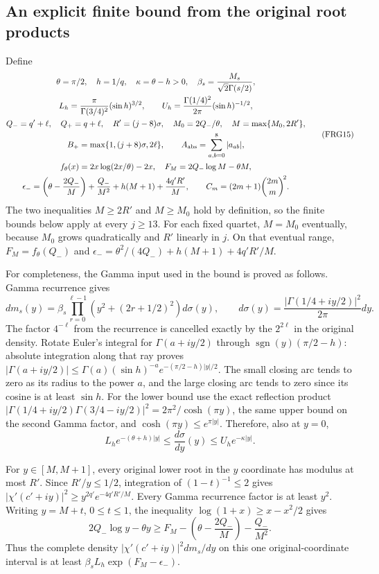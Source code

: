 \documentclass[11pt,a4paper]{article}
\begin{document}
\subsection{An explicit finite bound from the original root products}
Define
\[
\begin{gathered}
\theta=\pi/2,\quad h=1/q,\quad\kappa=\theta-h>0,
\quad\beta_s=\frac{M_s}{\sqrt2\Gamma(s/2)},\\
L_h=\frac{\pi}{\Gamma(3/4)^2}(\sin h)^{3/2},\qquad
U_h=\frac{\Gamma(1/4)^2}{2\pi}(\sin h)^{-1/2},\\
Q_-=q'+\ell,\quad Q_+=q+\ell,\quad
R'=(j-8)\sigma,\quad M_0=2Q_-/\theta,\quad M=\max\{M_0,2R'\},\\
B_+=\max\{1,(j+8)\sigma,2\ell\},\qquad
A_{\rm abs}=\sum_{a,b=0}^8|a_{ab}|,\\
f_\theta(x)=2x\log(2x/\theta)-2x,\quad F_M=2Q_-\log M-\theta M,\\
\epsilon_-=\left(\theta-\frac{2Q_-}M\right)
 +\frac{Q_-}{M^2}+h(M+1)+\frac{4q'R'}M,\qquad
C_m=(2m+1)\binom{2m}{m}^{\!2}.
\end{gathered}\tag{FRG15}
\]
The two inequalities $M\ge2R'$ and $M\ge M_0$ hold by definition,
so the finite bounds below apply at every $j\ge13$.
For each fixed quartet, $M=M_0$ eventually, because $M_0$ grows
quadratically and $R'$ linearly in $j$. On that eventual range,
$F_M=f_\theta(Q_-)$ and
$\epsilon_-=\theta^2/(4Q_-)+h(M+1)+4q'R'/M$.

For completeness, the Gamma input used in the bound is proved as
follows. Gamma recurrence gives
\[
dm_s(y)=\beta_s\prod_{r=0}^{\ell-1}(y^2+(2r+1/2)^2)d\sigma(y),
\qquad d\sigma(y)=\frac{|\Gamma(1/4+iy/2)|^2}{2\pi}dy.
\tag{FRG16}
\]
The factor $4^{-\ell}$ from the recurrence is cancelled exactly by the
$2^{2\ell}$ in the original density. Rotate Euler's integral for
$\Gamma(a+iy/2)$ through $\operatorname{sgn}(y)(\pi/2-h)$:
absolute integration along that ray proves
$|\Gamma(a+iy/2)|\le\Gamma(a)(\sin h)^{-a}
e^{-(\pi/2-h)|y|/2}$. The small closing arc tends to zero as its radius
to the power $a$, and the large closing arc tends to zero since its
cosine is at least $\sin h$. For the lower bound use the exact
reflection product
$|\Gamma(1/4+iy/2)\Gamma(3/4-iy/2)|^2=2\pi^2/\cosh(\pi y)$,
the same upper bound on the second Gamma factor, and
$\cosh(\pi y)\le e^{\pi|y|}$. Therefore, also at $y=0$,
\[
L_he^{-(\theta+h)|y|}\le\frac{d\sigma}{dy}(y)
                        \le U_he^{-\kappa|y|}.
\tag{FRG17}
\]

For $y\in[M,M+1]$, every original lower root in the $y$ coordinate
has modulus at most $R'$. Since $R'/y\le1/2$, integration of
$(1-t)^{-1}\le2$ gives
$|\chi'(c'+iy)|^2\ge y^{2q'}e^{-4q'R'/M}$.
Every Gamma recurrence factor is at least $y^2$. Writing $y=M+t$,
$0\le t\le1$, the inequality $\log(1+x)\ge x-x^2/2$ gives
\[
2Q_-\log y-\theta y\ge F_M-
             \left(\theta-\frac{2Q_-}M\right)-\frac{Q_-}{M^2}.
\tag{FRG18}
\]
Thus the complete density $|\chi'(c'+iy)|^2dm_s/dy$ on this one
original-coordinate interval is at least
$\beta_sL_h\exp(F_M-\epsilon_-)$.
\end{document}
